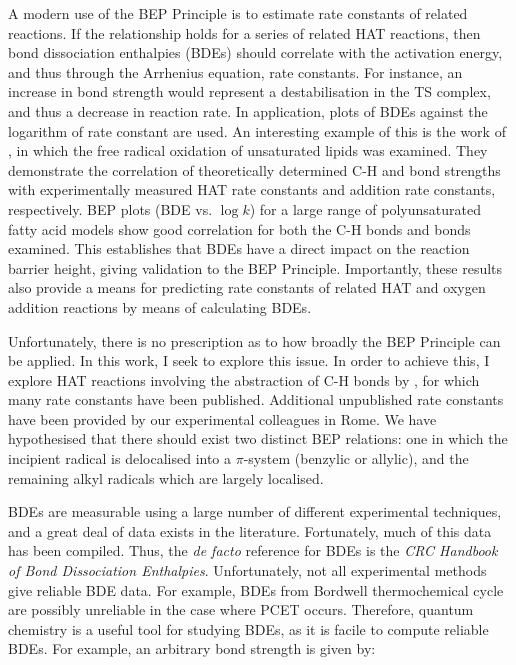 A modern use of the BEP Principle is to estimate rate constants of related reactions. If the relationship holds for a series of related HAT reactions, then bond dissociation enthalpies (BDEs) should correlate with the activation energy, and thus through the Arrhenius equation, rate constants. For instance, an increase in bond strength would represent a destabilisation in the TS complex, and thus a decrease in reaction rate. In application, plots of BDEs against the logarithm of rate constant are used. An interesting example of this is the work of \citet{Pratt2003}, in which the free radical oxidation of unsaturated lipids was examined. They demonstrate the correlation of theoretically determined C-H and  bond strengths with experimentally measured HAT rate constants and  addition rate constants, respectively. BEP plots (BDE vs. $\log k$) for a large range of polyunsaturated fatty acid models show good correlation for both the C-H bonds and  bonds examined. This establishes that BDEs have a direct impact on the reaction barrier height, giving validation to the BEP Principle. Importantly, these results also provide a means for predicting rate constants of related HAT and oxygen addition reactions by means of calculating BDEs.

Unfortunately, there is no prescription as to how broadly the BEP Principle can be applied. In this work, I seek to explore this issue. In order to achieve this, I explore HAT reactions involving the abstraction of C-H bonds by \cumo, for which many rate constants have been published.\cite{Bietti2010, Bietti2011, Pischel2001, Salamone2011, Salamone2012, Salamone2012a, Salamone2013, Salamone2015} Additional unpublished rate constants have been provided by our experimental colleagues in Rome. We have hypothesised that there should exist two distinct BEP relations: one in which the incipient radical is delocalised into a $\pi$-system (benzylic or allylic), and the remaining alkyl radicals which are largely localised.

BDEs are measurable using a large number of different experimental techniques, and a great deal of data exists in the literature. Fortunately, much of this data has been compiled. Thus, the \emph{de facto} reference for BDEs is the \emph{CRC Handbook of Bond Dissociation Enthalpies}.\cite{Luo2002} Unfortunately, not all experimental methods give reliable BDE data. For example, BDEs from Bordwell\cite{Bordwell1988} thermochemical cycle are possibly unreliable in the case where PCET occurs.\cite{Miller2016} Therefore, quantum chemistry is a useful tool for studying BDEs, as it is facile to compute reliable BDEs. For example, an arbitrary  bond strength is given by:

